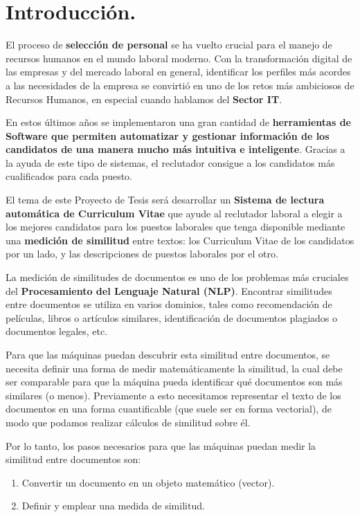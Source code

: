 \documentclass[12pt,a4paper]{article}
\begin{document}
\cleardoublepage    %

\section{Introducción.}
El proceso de \textbf{selección de personal} se ha vuelto crucial para el manejo de recursos humanos en el mundo laboral moderno. Con la transformación digital de las empresas y del mercado laboral en general, identificar los perfiles más acordes a las necesidades de la empresa se convirtió en uno de los retos más ambiciosos de Recursos Humanos, en especial cuando hablamos del \textbf{Sector IT}. 

En estos últimos años se implementaron una gran cantidad de \textbf{herramientas de Software que permiten automatizar y gestionar información de los candidatos de una manera mucho más intuitiva e inteligente}. Gracias a la ayuda de este tipo de sistemas, el reclutador consigue a los candidatos más cualificados para cada puesto.

El tema de este Proyecto de Tesis será desarrollar un \textbf{Sistema de lectura automática de Curriculum Vitae} que ayude al reclutador laboral a elegir a los mejores candidatos para los puestos laborales que tenga disponible mediante una \textbf{medición de similitud} entre textos: los Curriculum Vitae de los candidatos por un lado, y las descripciones de puestos laborales por el otro.

La medición de similitudes de documentos es uno de los problemas más cruciales del \textbf{Procesamiento del Lenguaje Natural (NLP)}. Encontrar similitudes entre documentos se utiliza en varios dominios, tales como recomendación de películas, libros o artículos similares, identificación de documentos plagiados o documentos legales, etc. 

Para que las máquinas puedan descubrir esta similitud entre documentos, se necesita definir una forma de medir matemáticamente la similitud, la cual debe ser comparable para que la máquina pueda identificar qué documentos son más similares (o menos). Previamente a esto necesitamos representar el texto de los documentos en una forma cuantificable (que suele ser en forma vectorial), de modo que podamos realizar cálculos de similitud sobre él.

Por lo tanto, los pasos necesarios para que las máquinas puedan medir la similitud entre documentos son:
\begin{enumerate}
\item Convertir un documento en un objeto matemático (vector).
\item Definir y emplear una medida de similitud.
\end{enumerate}
\end{document}
